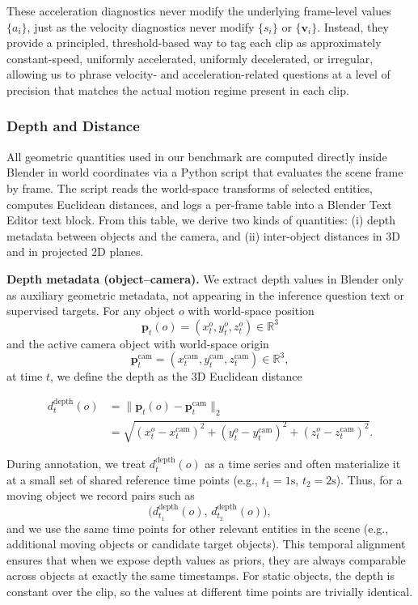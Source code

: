 These acceleration diagnostics never modify the underlying frame-level values \(\{a_i\}\), just as the velocity diagnostics never modify \(\{s_i\}\) or \(\{\mathbf{v}_i\}\). Instead, they provide a principled, threshold-based way to tag each clip as approximately constant-speed, uniformly accelerated, uniformly decelerated, or irregular, allowing us to phrase velocity- and acceleration-related questions at a level of precision that matches the actual motion regime present in each clip.


\subsubsection{Depth and Distance}

All geometric quantities used in our benchmark are computed directly inside Blender in world coordinates via a Python script that evaluates the scene frame by frame. The script reads the world-space transforms of selected entities, computes Euclidean distances, and logs a per-frame table into a Blender Text Editor text block. From this table, we derive two kinds of quantities: (i) depth metadata between objects and the camera, and (ii) inter-object distances in 3D and in projected 2D planes. 

\noindent\textbf{Depth metadata (object--camera).}
We extract depth values in Blender only as auxiliary geometric metadata,
not appearing in the inference question text or supervised targets. For any
object \(o\) with world-space position
\[
\mathbf{p}_t(o) = (x_t^o, y_t^o, z_t^o) \in \mathbb{R}^3
\]
and the active camera object with world-space origin
\[
\mathbf{p}_t^{\text{cam}} = (x_t^{\text{cam}}, y_t^{\text{cam}}, z_t^{\text{cam}}) \in \mathbb{R}^3,
\]
at time \(t\), we define the depth as the 3D Euclidean distance

\[
\begin{aligned}
d^{\text{depth}}_t(o)
&= \bigl\lVert \mathbf{p}_t(o) - \mathbf{p}_t^{\text{cam}} \bigr\rVert_2 \\
&= \sqrt{(x_t^o - x_t^{\text{cam}})^2 + (y_t^o - y_t^{\text{cam}})^2 + (z_t^o - z_t^{\text{cam}})^2}.
\end{aligned}
\]

During annotation, we treat \(d^{\text{depth}}_t(o)\) as a time series and often materialize it at a small set of shared reference time points (e.g., \(t_1 = 1\text{s}\), \(t_2 = 2\text{s}\)). Thus, for a moving object we record pairs such as
\[
\bigl(d^{\text{depth}}_{t_1}(o),\, d^{\text{depth}}_{t_2}(o)\bigr),
\]
and we use the same time points for other relevant entities in the scene (e.g., additional moving objects or candidate target objects). This temporal alignment ensures that when we expose depth values as priors, they are always comparable across objects at exactly the same timestamps. For static objects, the depth is constant over the clip, so the values at different time points are trivially identical.

